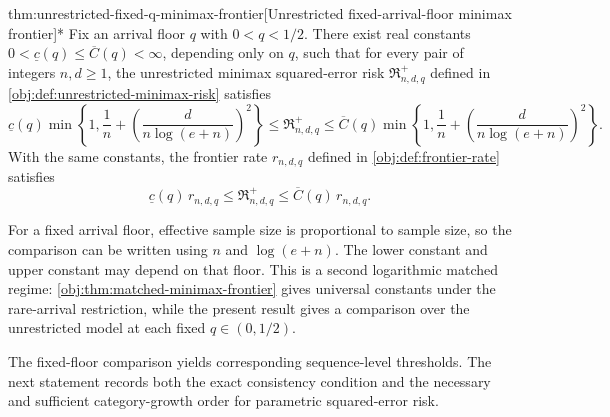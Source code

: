 \begin{theoremv}{thm:unrestricted-fixed-q-minimax-frontier}[Unrestricted fixed-arrival-floor minimax frontier]*
Fix an arrival floor \(q\) with \(0<q<1/2\). There exist real constants \(0<\underline c(q)\le \overline C(q)<\infty\), depending only on \(q\), such that for every pair of integers \(n,d\ge1\), the unrestricted minimax squared-error risk \(\mathfrak R^{+}_{n,d,q}\) defined in \cref{obj:def:unrestricted-minimax-risk} satisfies
\[
\underline c(q)
\min\left\{1,\frac1n+\left(\frac{d}{n\log(e+n)}\right)^2\right\}
\le \mathfrak R^{+}_{n,d,q}
\le \overline C(q)
\min\left\{1,\frac1n+\left(\frac{d}{n\log(e+n)}\right)^2\right\}.
\]
With the same constants, the frontier rate \(r_{n,d,q}\) defined in \cref{obj:def:frontier-rate} satisfies
\[
\underline c(q)\,r_{n,d,q}
\le \mathfrak R^{+}_{n,d,q}
\le \overline C(q)\,r_{n,d,q}.
\]
\end{theoremv}

For a fixed arrival floor, effective sample size is proportional to sample size, so the comparison can be written using \(n\) and \(\log(e+n)\). The lower constant  and upper constant  may depend on that floor. This is a second logarithmic matched regime: \cref{obj:thm:matched-minimax-frontier} gives universal constants under the rare-arrival restriction, while the present result gives a comparison over the unrestricted model at each fixed \(q\in(0,1/2)\).

The fixed-floor comparison yields corresponding sequence-level thresholds. The next statement records both the exact consistency condition and the necessary and sufficient category-growth order for parametric squared-error risk.

